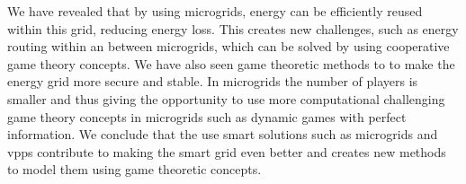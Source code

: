 We have revealed that by using microgrids, energy can be efficiently reused within this grid, reducing energy loss. This creates new challenges, such as energy routing within an between microgrids, which can be solved by using cooperative game theory concepts. 
We have also seen game theoretic methods to to make the energy grid more secure and stable.
In microgrids the number of players is smaller and thus giving the opportunity to use more computational challenging game theory concepts in microgrids such as dynamic games with perfect information.
We conclude that the use smart solutions such as microgrids and \acp{vpp} contribute to making the smart grid even better and creates new methods to model them using game theoretic concepts.
